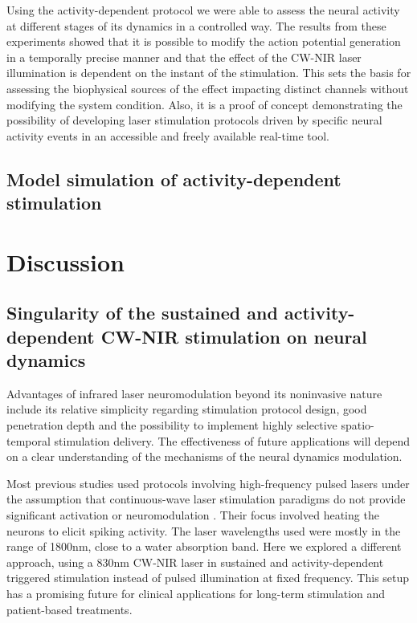 Using the activity-dependent protocol we were able to assess the neural activity at different stages of its dynamics in a controlled way. The results from these experiments showed that it is possible to modify the action potential generation in a temporally precise manner and that the effect of the CW-NIR laser illumination is dependent on the instant of the stimulation. This sets the basis for assessing the biophysical sources of the effect impacting distinct channels without modifying the system condition. Also, it is a proof of concept demonstrating the possibility of developing laser stimulation protocols driven by specific neural activity events in an accessible and freely available real-time tool.

\subsection{Model simulation of activity-dependent stimulation}





\section{Discussion}
\subsection{Singularity of the sustained and activity-dependent CW-NIR stimulation on neural dynamics}
Advantages of infrared laser neuromodulation beyond its noninvasive nature include its relative simplicity regarding stimulation protocol design, good penetration depth and the possibility to implement highly selective spatio-temporal stimulation delivery. The effectiveness of future applications will depend on a clear understanding of the mechanisms of the neural dynamics modulation.

Most previous studies used protocols involving high-frequency pulsed lasers under the assumption that continuous-wave laser stimulation paradigms do not provide significant activation or neuromodulation \parencite{wells_application_2005, wells_application_2005-1, cayce_infrared_2014, chernov_infrared_2014, goyal_acute_2012, pan_infrared_2023}. Their focus involved heating the neurons to elicit spiking activity. The laser wavelengths used were mostly in the range of 1800nm, close to a water absorption band. Here we explored a different approach, using a 830nm CW-NIR laser in sustained and activity-dependent triggered stimulation instead of pulsed illumination at fixed frequency. This setup has a promising future for clinical applications for long-term stimulation and patient-based treatments.

